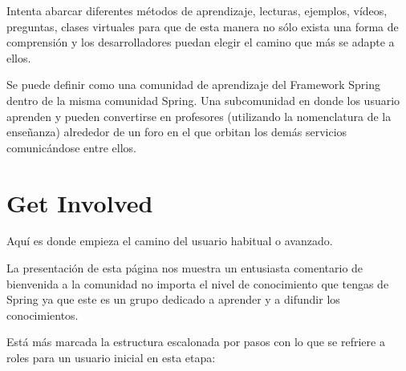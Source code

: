 \documentclass[11pt]{scrartcl}
\begin{document}
Intenta abarcar diferentes métodos de aprendizaje, lecturas, ejemplos, vídeos, preguntas, clases virtuales para que de esta manera no sólo exista una forma de comprensión y los desarrolladores puedan elegir el camino que más se adapte a ellos.

Se puede definir como una comunidad de aprendizaje del Framework Spring dentro de la misma comunidad Spring. Una subcomunidad en donde los usuario aprenden y pueden convertirse en profesores (utilizando la nomenclatura de la enseñanza) alrededor de un foro en el que orbitan los demás servicios comunicándose entre ellos.

\section{Get Involved}

Aquí es donde empieza el camino del usuario habitual o avanzado.

La presentación de esta página nos muestra un entusiasta comentario de bienvenida a la comunidad no importa el nivel de conocimiento que tengas de Spring ya que este es un grupo dedicado a aprender y a difundir los conocimientos.

Está más marcada la estructura escalonada por pasos con lo que se refriere a roles para un usuario inicial en esta etapa:
\end{document}
